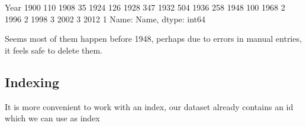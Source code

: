 \documentclass[letterpaper,10pt,english]{jupyterBook}
\begin{document}
\begin{sphinxVerbatim}[commandchars=\\\{\}]
  \PYG{p}{[}\PYG{p}{[}    \PYG{p}{]}\PYG{p}{]}
\PYG{p}{[}\PYG{p}{]}\PYG{p}{[}\PYG{p}{]}
\end{sphinxVerbatim}

\begin{sphinxVerbatim}[commandchars=\\\{\}]
Year
1900    110
1908     35
1924    126
1928    347
1932    504
1936    258
1948    100
1968      2
1996      2
1998      3
2002      3
2012      1
Name: Name, dtype: int64
\end{sphinxVerbatim}

\sphinxAtStartPar
Seems most of them happen before 1948, perhaps due to errors in manual entries, it feels safe to delete them.

\begin{sphinxVerbatim}[commandchars=\\\{\}]
  \PYG{p}{[}    \PYG{p}{]}
\end{sphinxVerbatim}


\subsection{Indexing}
\label{\detokenize{c7_case_studies/Olympics:indexing}}
\sphinxAtStartPar
It is more convenient to work with an index, our dataset already contains an id which we can use as index
\end{document}
